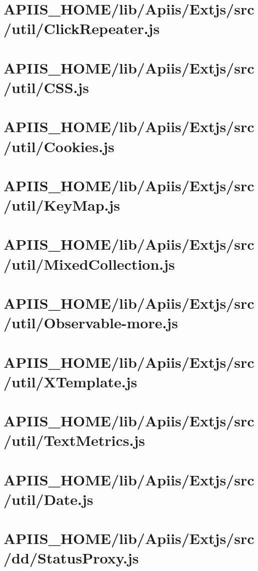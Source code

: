 \section{APIIS\_HOME/lib/Apiis/Extjs/src/util/ClickRepeater.js} 
\section{APIIS\_HOME/lib/Apiis/Extjs/src/util/CSS.js} 
\section{APIIS\_HOME/lib/Apiis/Extjs/src/util/Cookies.js} 
\section{APIIS\_HOME/lib/Apiis/Extjs/src/util/KeyMap.js} 
\section{APIIS\_HOME/lib/Apiis/Extjs/src/util/MixedCollection.js} 
\section{APIIS\_HOME/lib/Apiis/Extjs/src/util/Observable-more.js} 
\section{APIIS\_HOME/lib/Apiis/Extjs/src/util/XTemplate.js} 
\section{APIIS\_HOME/lib/Apiis/Extjs/src/util/TextMetrics.js} 
\section{APIIS\_HOME/lib/Apiis/Extjs/src/util/Date.js} 
\section{APIIS\_HOME/lib/Apiis/Extjs/src/dd/StatusProxy.js} 
